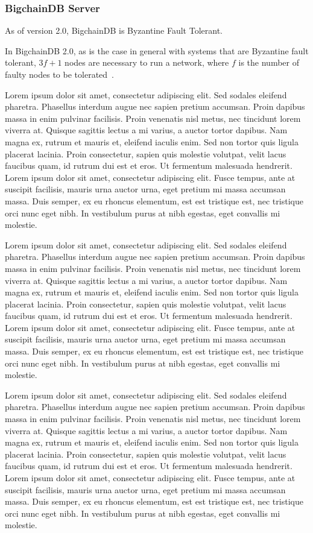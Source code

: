 \subsubsection{BigchainDB Server}

As of version 2.0, BigchainDB is Byzantine Fault Tolerant.

﻿In BigchainDB 2.0, as is the case in general with systems that are
Byzantine fault tolerant, $3f + 1$ nodes are necessary to run a network,
where $f$ is the number of faulty nodes to be tolerated~\cite{bdb18}.

Lorem ipsum dolor sit amet, consectetur adipiscing elit. Sed sodales
eleifend pharetra. Phasellus interdum augue nec sapien pretium accumsan.
Proin dapibus massa in enim pulvinar facilisis. Proin venenatis nisl metus,
nec tincidunt lorem viverra at. Quisque sagittis lectus a mi varius, a
auctor tortor dapibus. Nam magna ex, rutrum et mauris et, eleifend iaculis
enim. Sed non tortor quis ligula placerat lacinia. Proin consectetur, sapien
quis molestie volutpat, velit lacus faucibus quam, id rutrum dui est et
eros. Ut fermentum malesuada hendrerit. Lorem ipsum dolor sit amet,
consectetur adipiscing elit. Fusce tempus, ante at suscipit facilisis,
mauris urna auctor urna, eget pretium mi massa accumsan massa. Duis semper,
ex eu rhoncus elementum, est est tristique est, nec tristique orci nunc eget
nibh. In vestibulum purus at nibh egestas, eget convallis mi molestie.

Lorem ipsum dolor sit amet, consectetur adipiscing elit. Sed sodales
eleifend pharetra. Phasellus interdum augue nec sapien pretium accumsan.
Proin dapibus massa in enim pulvinar facilisis. Proin venenatis nisl metus,
nec tincidunt lorem viverra at. Quisque sagittis lectus a mi varius, a
auctor tortor dapibus. Nam magna ex, rutrum et mauris et, eleifend iaculis
enim. Sed non tortor quis ligula placerat lacinia. Proin consectetur, sapien
quis molestie volutpat, velit lacus faucibus quam, id rutrum dui est et
eros. Ut fermentum malesuada hendrerit. Lorem ipsum dolor sit amet,
consectetur adipiscing elit. Fusce tempus, ante at suscipit facilisis,
mauris urna auctor urna, eget pretium mi massa accumsan massa. Duis semper,
ex eu rhoncus elementum, est est tristique est, nec tristique orci nunc eget
nibh. In vestibulum purus at nibh egestas, eget convallis mi molestie.

Lorem ipsum dolor sit amet, consectetur adipiscing elit. Sed sodales
eleifend pharetra. Phasellus interdum augue nec sapien pretium accumsan.
Proin dapibus massa in enim pulvinar facilisis. Proin venenatis nisl metus,
nec tincidunt lorem viverra at. Quisque sagittis lectus a mi varius, a
auctor tortor dapibus. Nam magna ex, rutrum et mauris et, eleifend iaculis
enim. Sed non tortor quis ligula placerat lacinia. Proin consectetur, sapien
quis molestie volutpat, velit lacus faucibus quam, id rutrum dui est et
eros. Ut fermentum malesuada hendrerit. Lorem ipsum dolor sit amet,
consectetur adipiscing elit. Fusce tempus, ante at suscipit facilisis,
mauris urna auctor urna, eget pretium mi massa accumsan massa. Duis semper,
ex eu rhoncus elementum, est est tristique est, nec tristique orci nunc eget
nibh. In vestibulum purus at nibh egestas, eget convallis mi molestie.

